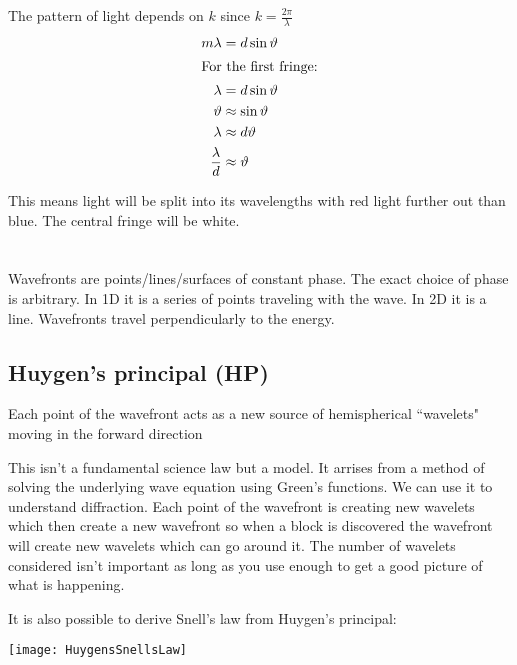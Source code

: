The pattern of light depends on \(k\) since \(k=\frac{2\pi}{\lambda}\)
\begin{align*}
m\lambda&=d\sin\vartheta\\
\intertext{For the first fringe:}
\lambda&=d\sin\vartheta\\
\vartheta&\approx\sin\vartheta\\
\lambda&\approx d\vartheta\\
\frac{\lambda}{d}&\approx\vartheta
\end{align*}

This means light will be split into its wavelengths with red light further out than blue. The central fringe will be white.

\section{}
Wavefronts are points/lines/surfaces of constant phase. The exact choice of phase is arbitrary. In 1D it is a series of points traveling with the wave. In 2D it is a line. Wavefronts travel perpendicularly to the energy.

\subsection*{Huygen's principal (HP)}

\begin{displayquote}
Each point of the wavefront acts as a new source of hemispherical ``wavelets" moving in the forward direction
\end{displayquote}

This isn't a fundamental science law but a model. It arrises from a method of solving the underlying wave equation using Green's functions. We can use it to understand diffraction. Each point of the wavefront is creating new wavelets which then create a new wavefront so when a block is discovered the wavefront will create new wavelets which can go around it. The number of wavelets considered isn't important as long as you use enough to get a good picture of what is happening.

It is also possible to derive Snell's law from Huygen's principal:

\begin{center}
\texttt{[image: HuygensSnellsLaw]}
\end{center}

